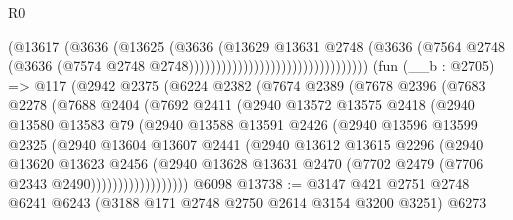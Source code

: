 \begin{lexlean}{R0}
\begin{coremodule}
                                                    (@13617
                                                      (@3636
                                                        (@13625
                                                          (@3636
                                                            (@13629
                                                              @13631
                                                              @2748
                                                              (@3636
                                                                (@7564
                                                                  @2748
                                                                  (@3636
                                                                    (@7574
                                                                      @2748
                                                                      @2748)))))))))))))))))))))))))))))))))
    (fun (__b : @2705) =>
    @117
      (@2942
        @2375
        (@6224
          @2382
          (@7674
            @2389
            (@7678
              @2396
              (@7683
                @2278
                (@7688
                  @2404
                  (@7692
                    @2411
                    (@2940
                      @13572
                      @13575
                      @2418
                      (@2940
                        @13580
                        @13583
                        @79
                        (@2940
                          @13588
                          @13591
                          @2426
                          (@2940
                            @13596
                            @13599
                            @2325
                            (@2940
                              @13604
                              @13607
                              @2441
                              (@2940
                                @13612
                                @13615
                                @2296
                                (@2940
                                  @13620
                                  @13623
                                  @2456
                                  (@2940
                                    @13628
                                    @13631
                                    @2470
                                    (@7702 @2479 (@7706 @2343 @2490))))))))))))))))))
    @6098
@13738 := @3147 @421 @2751 @2748 @6241 @6243 (@3188 @171 @2748 @2750 @2614 @3154 @3200 @3251) @6273

\end{coremodule}
\end{lexlean}

